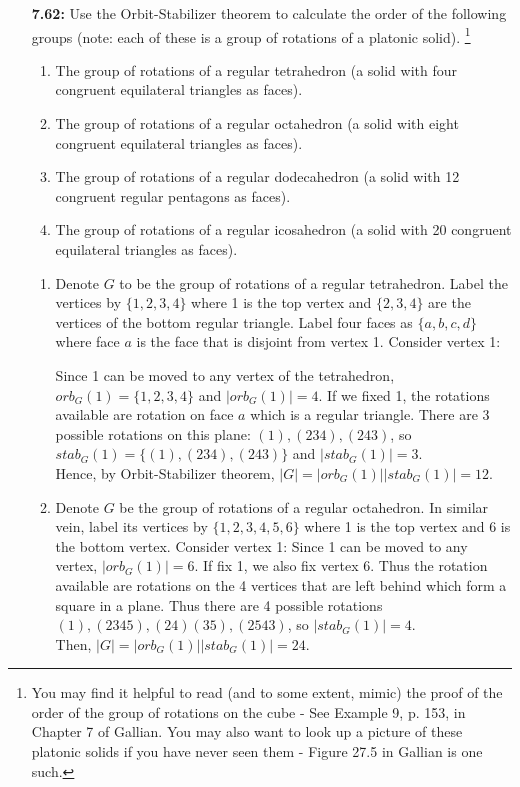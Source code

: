 \documentclass[11pt, oneside]{article}
\begin{document}
\begin{enumerate}
\begin{enumerate}[a)]
\end {enumerate}

\newpage
\item [{\bf 7.62:}]  Use the Orbit-Stabilizer theorem to calculate the order of the following groups (note: each of these is a group of rotations of a platonic solid). \footnote{You may find it helpful to read (and to some extent, mimic) the proof of the order of the group of rotations on the cube - See Example 9, p. 153, in Chapter 7 of Gallian. You may also want to look up a picture of these platonic solids if you have never seen them - Figure 27.5 in Gallian is one such.}
\begin{enumerate}
\item The group of rotations of a regular tetrahedron (a solid with four congruent equilateral triangles as faces).
\item The group of rotations of a regular octahedron (a solid with eight congruent equilateral triangles as faces).
\item The group of rotations of a regular dodecahedron (a solid with 12 congruent regular pentagons as faces).
\item The group of rotations of a regular icosahedron (a solid with 20 congruent equilateral triangles as faces).
\end{enumerate}
\begin{enumerate}

\item Denote $G$ to be the group of rotations of a regular tetrahedron. Label the vertices by $\{1, 2, 3, 4\}$ where 1 is the top vertex and $\{2, 3, 4\}$ are the vertices of the bottom regular triangle. Label four faces as $\{a, b, c, d\}$ where face $a$ is the face that is disjoint from vertex 1. Consider vertex 1: 

\newline Since 1 can be moved to any vertex of the tetrahedron, $orb_G(1)=\{1, 2, 3, 4\}$ and $|orb_G(1)| = 4.$ 
\newline If we fixed 1, the rotations available are rotation on face $a$ which is a regular triangle. There are 3 possible rotations on this plane: $(1), (234), (243)$, so $stab_G(1)=\{(1), (234), (243)\}$ and $|stab_G(1)|=3.$\\
Hence, by Orbit-Stabilizer theorem, $|G|=|orb_G(1)||stab_G(1)|=12.$\\

\item Denote $G$ be the group of rotations of a regular octahedron. In similar vein, label its vertices by $\{1,2,3,4,5,6\}$ where 1 is the top vertex and 6 is the bottom vertex. Consider vertex 1: 
\newline Since 1 can be moved to any vertex, $|orb_G(1)|=6 $. If fix 1, we also fix vertex 6. Thus the rotation available are rotations on the 4 vertices that are left behind which form a square in a plane. Thus there are 4 possible rotations $(1), (2345), (24)(35), (2543)$, so $|stab_G(1)|= 4.$ \\
Then, $|G|=|orb_G(1)||stab_G(1)|=24.$\\


\end{enumerate}
\end{enumerate}
\end{document}
